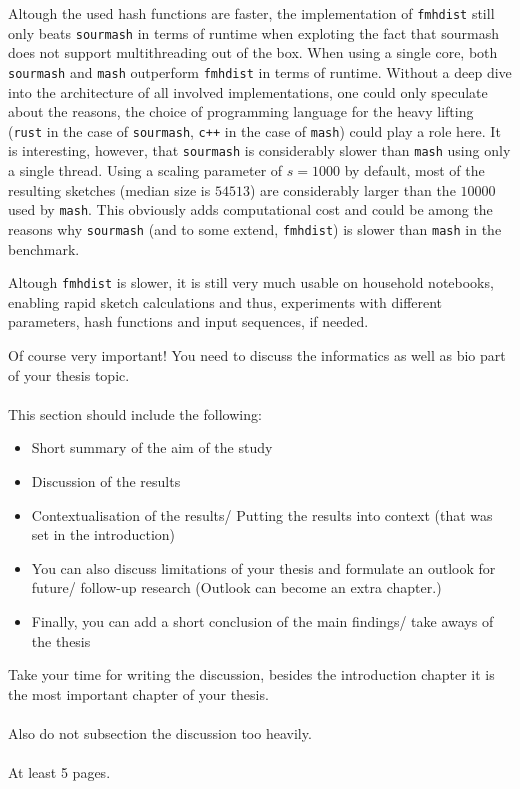 Altough the used hash functions are faster, the implementation of
\texttt{fmhdist} still only beats \texttt{sourmash} in terms of runtime when
exploting the fact that sourmash does not support multithreading out of the box.
When using a single core, both \texttt{sourmash} and \texttt{mash} outperform
\texttt{fmhdist} in terms of runtime. Without a deep dive into the architecture
of all involved implementations, one could only speculate about the reasons, the
choice of programming language for the heavy lifting (\texttt{rust} in the case
of \texttt{sourmash}, \texttt{c++} in the case of \texttt{mash}) could play a
role here. It is interesting, however, that \texttt{sourmash} is considerably
slower than \texttt{mash} using only a single thread. Using a scaling parameter
of $s=1000$ by default, most of the resulting sketches (median size is $54513$)
are considerably larger than the $10000$ used by \texttt{mash}. This obviously
adds computational cost and could be among the reasons why \texttt{sourmash}
(and to some extend, \texttt{fmhdist}) is slower than \texttt{mash} in the
benchmark.

Altough \texttt{fmhdist} is slower, it is still very much usable on household
notebooks, enabling rapid sketch calculations and thus, experiments with
different parameters, hash functions and input sequences, if needed.



Of course very important! You need to discuss the informatics as well as bio part of your thesis topic.\\\\
This section should include the following:
\begin{itemize}
  \item Short summary of the aim of the study
  \item Discussion of the results
  \item Contextualisation of the results/ Putting the results into context (that was set in the introduction)
  \item You can also discuss limitations of your thesis and formulate an outlook for future/ follow-up research (Outlook can become an extra chapter.)
  \item Finally, you can add a short conclusion of the main findings/ take aways of the thesis
\end{itemize}
Take your time for writing the discussion, besides the introduction chapter it is the most important chapter of your thesis.\\\\
Also do not subsection the discussion too heavily.\\\\
At least 5 pages.